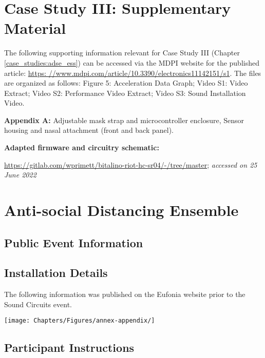 

\chapter{Case Study III: Supplementary Material}
\label{app:adse_materials}

The following supporting information relevant for Case Study III (Chapter \ref{case_studies:adse_ess}) can be accessed via the MDPI website for the published article: \url{https: //www.mdpi.com/article/10.3390/electronics11142151/s1}. The files are organized as follows: Figure 5: Acceleration Data Graph; Video S1: Video Extract; Video S2: Performance Video Extract; Video S3: Sound Installation Video.

\textbf{Appendix A:} Adjustable mask strap and microcontroller enclosure, Sensor housing and nasal attachment (front and back panel).

\textbf{Adapted firmware and circuitry schematic:} 

\url{https://gitlab.com/wprimett/bitalino-riot-hc-sr04/-/tree/master}; \textit{accessed on 25 June 2022}

\chapter{Anti-social Distancing Ensemble}
\label{app:adse_installation}

\section*{Public Event Information}



\section*{Installation Details}

The following information was published on the Eufonia website prior to the Sound Circuits event.

\texttt{[image: Chapters/Figures/annex-appendix/]}
\label{fig:adse_details}

\section*{Participant Instructions}

